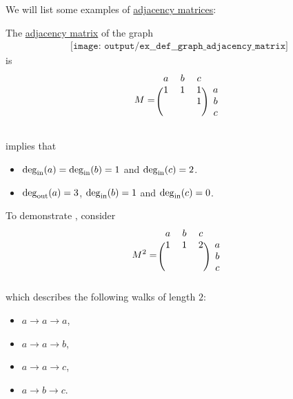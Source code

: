 \begin{example}\label{ex:def:graph_adjacency_matrix}
  We will list some examples of \hyperref[def:graph_adjacency_matrix]{adjacency matrices}:
  \begin{thmenum}
     The \hyperref[def:graph_adjacency_matrix]{adjacency matrix} of the graph
    \begin{equation}\label{eq:ex:def:graph_adjacency_matrix/triangle/graph}
      \begin{aligned}
        \texttt{[image: output/ex\_\_def\_\_graph\_adjacency\_matrix]}
      \end{aligned}
    \end{equation}
    is
    \begin{equation}\label{eq:ex:def:graph_adjacency_matrix/triangle/graph/matrix}
      M =
      \begin{blockarray}{cccc}
        a & b & c & \\
      \begin{block}{(ccc)c}
        1 & 1 & 1 & a \\
          &   & 1 & b \\
          &   &   & c \\
      \end{block}
      \end{blockarray}
    \end{equation}

     implies that
    \begin{itemize}
      \item \( \deg_{\op{in}}(a) = \deg_{\op{in}}(b) = 1 \) and \( \deg_{\op{in}}(c) = 2 \).
      \item \( \deg_{\op{out}}(a) = 3 \), \( \deg_{\op{in}}(b) = 1 \) and \( \deg_{\op{in}}(c) = 0 \).
    \end{itemize}

    To demonstrate , consider
    \begin{equation*}
      M^2 =
      \begin{blockarray}{cccc}
        a & b & c & \\
      \begin{block}{(ccc)c}
        1 & 1 & 2 & a \\
          &   &   & b \\
          &   &   & c \\
      \end{block}
      \end{blockarray}
    \end{equation*}
    which describes the following walks of length \( 2 \):
    \begin{itemize}
      \item \( a \to a \to a \),
      \item \( a \to a \to b \),
      \item \( a \to a \to c \),
      \item \( a \to b \to c \).
    \end{itemize}


\end{thmenum}
\end{example}
